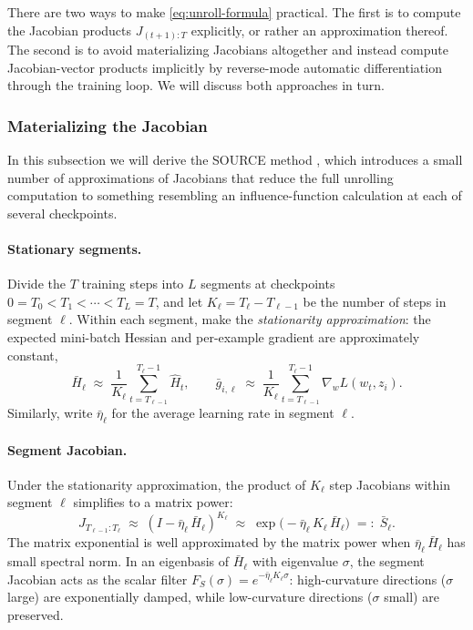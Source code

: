 \documentclass[11pt]{article}
\begin{document}
There are two ways to make \eqref{eq:unroll-formula} practical. The first is to compute the Jacobian products $J_{(t+1):T}$ explicitly, or rather an approximation thereof. The second is to avoid materializing Jacobians altogether and instead compute Jacobian-vector products implicitly by reverse-mode automatic differentiation through the training loop. We will discuss both approaches in turn.

\subsubsection{Materializing the Jacobian}\label{subsec:explicit-unroll}

 In this subsection we will derive the SOURCE method \citep{bae2024source}, which introduces a small number of approximations of Jacobians that reduce the full unrolling computation to something resembling an influence-function calculation at each of several checkpoints.

\paragraph{Stationary segments.} Divide the $T$ training steps into $L$ segments at checkpoints $0 = T_0 < T_1 < \cdots < T_L = T$, and let $K_\ell = T_\ell - T_{\ell-1}$ be the number of steps in segment $\ell$. Within each segment, make the \emph{stationarity approximation}: the expected mini-batch Hessian and per-example gradient are approximately constant,
\begin{equation}\label{eq:stationary-approx}
  \bar{H}_\ell \;\approx\; \frac{1}{K_\ell}\sum_{t=T_{\ell-1}}^{T_\ell - 1}\widehat{H}_t, \qquad \bar{g}_{i,\ell} \;\approx\; \frac{1}{K_\ell}\sum_{t=T_{\ell-1}}^{T_\ell - 1}\nabla_w L(w_t,z_i).
\end{equation}
Similarly, write $\bar\eta_\ell$ for the average learning rate in segment $\ell$.

\paragraph{Segment Jacobian.} Under the stationarity approximation, the product of $K_\ell$ step Jacobians within segment $\ell$ simplifies to a matrix power:
\begin{equation}\label{eq:segment-jacobian}
  J_{T_{\ell-1}:T_\ell} \;\approx\; (I - \bar\eta_\ell\,\bar{H}_\ell)^{K_\ell} \;\approx\; \exp\bigl(-\bar\eta_\ell\,K_\ell\,\bar{H}_\ell\bigr) \;=:\; \bar{S}_\ell.
\end{equation}
The matrix exponential is well approximated by the matrix power when $\bar\eta_\ell\,\bar{H}_\ell$ has small spectral norm. In an eigenbasis of $\bar{H}_\ell$ with eigenvalue $\sigma$, the segment Jacobian acts as the scalar filter $F_S(\sigma) = e^{-\bar\eta_\ell K_\ell \sigma}$: high-curvature directions ($\sigma$ large) are exponentially damped, while low-curvature directions ($\sigma$ small) are preserved.
\end{document}
